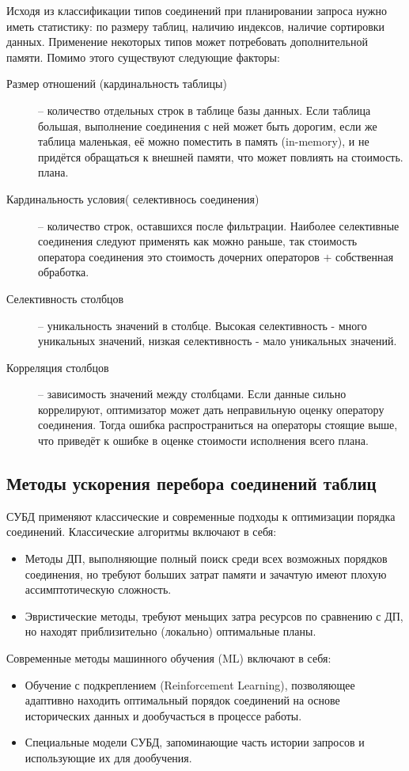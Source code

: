 \documentclass[12pt]{article}
\begin{document}
\begin{flushleft}
Исходя из классификации типов соединений при планировании запроса нужно иметь 
статистику: по размеру таблиц, наличию индексов, наличие сортировки данных. 
Применение некоторых типов может потребовать дополнительной памяти.
Помимо этого существуют следующие факторы:
\begin{description}
    \item[Размер отношений (кардинальность таблицы)] -- количество отдельных строк 
    в таблице базы данных. Если таблица большая, выполнение соединения с ней может 
    быть дорогим, если же таблица маленькая, её можно поместить в память (in-memory), 
    и не придётся обращаться к внешней памяти, что может повлиять на стоимость.
    плана.
    \item[Кардинальность условия( селективнось соединения)] -- количество строк, оставшихся после фильтрации. 
    Наиболее селективные соединения следуют применять как можно раньше, так стоимость 
    оператора соединения это стоимость дочерних операторов $+$ собственная обработка.
    \item[Селективность столбцов] -- уникальность значений в столбце. 
    Высокая селективность - много уникальных значений, низкая селективность - мало уникальных значений.
    \item[Корреляция столбцов] -- зависимость значений между столбцами. 
    Если данные сильно коррелируют, оптимизатор может дать неправильную оценку 
    оператору соединения. Тогда ошибка распространиться на операторы стоящие выше,
    что приведёт к ошибке в оценке стоимости исполнения всего плана.
\end{description}

\centering \subsection*{Методы ускорения перебора соединений таблиц}
\raggedright

СУБД применяют классические и современные подходы к оптимизации 
порядка соединений.
\newline
Классические алгоритмы включают в себя:
\begin{itemize}
\item Методы ДП, выполняющие полный поиск среди всех возможных порядков
соединения, но требуют больших затрат памяти и зачачтую имеют плохую
ассимптотическую сложность.
\item Эвристические методы, требуют меньщих затра ресурсов по сравнению
с ДП, но находят приблизительно (локально) оптимальные планы.
\end{itemize}
Современные методы машинного обучения (ML) включают в себя:
\begin{itemize}
\item Обучение с подкреплением (Reinforcement Learning), позволяющее 
адаптивно находить оптимальный порядок соединений на основе исторических 
данных и дообучасться в процессе работы.
\item Специальные модели СУБД, запоминающие часть истории запросов и использующие их
для дообучения.
\end{itemize}
\end{flushleft}
\end{document}
